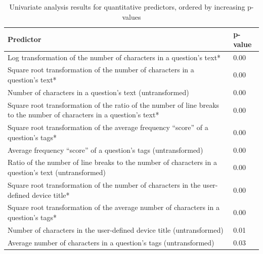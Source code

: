 \documentclass{article}
\begin{document}
\begin{table}[ht]
\centering
\caption{Univariate analysis results for quantitative predictors, ordered by increasing p-values} 
\begin{tabular}{|p{12cm}|p{2cm}|}
  \hline
  Predictor & p-value \\ 
  \hline \hline
  Log transformation of the number of characters in a question's text* & 0.00 \\ 
  \hline
  Square root transformation of the number of characters in a question's text* & 0.00 \\ 
  \hline
  Number of characters in a question's text (untransformed) & 0.00 \\
  \hline
  Square root transformation of the ratio of the number of line breaks to the number of characters in a question's text* & 0.00 \\ 
  \hline
  Square root transformation of the average frequency ``score'' of a question's tags* & 0.00 \\ 
  \hline
  Average frequency ``score'' of a question's tags (untransformed) & 0.00 \\ 
  \hline
  Ratio of the number of line breaks to the number of characters in a question's text (untransformed) & 0.00 \\ 
  \hline
  Square root transformation of the number of characters in the user-defined device title* & 0.00 \\ 
  \hline
  Square root transformation of the average number of characters in a question's tags* & 0.00 \\ 
  \hline
  Number of characters in the user-defined device title (untransformed) & 0.01 \\ 
  \hline
  Average number of characters in a question's tags (untransformed) & 0.03 \\ 
   \hline
\end{tabular}
\label{table:qresults}
\end{table}
\end{document}
